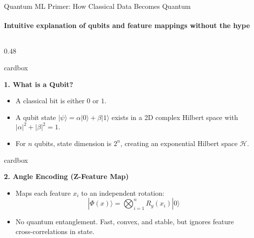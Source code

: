 \documentclass[aspectratio=169, 10pt]{beamer}
\newcommand{\cardbox}[3]{%
  \begin{beamercolorbox}[wd=\linewidth,rounded=true,sep=2.5pt]{cardbox}%
    {\bfseries\scriptsize\color{#1}#2\par}\vspace*{1pt}%
    {\footnotesize #3}%
  \end{beamercolorbox}%
}
\begin{document}
\begin{frame}{Quantum ML Primer: How Classical Data Becomes Quantum}
  \framesubtitle{Intuitive explanation of qubits and feature mappings without the hype}

  \begin{columns}[T]
    \begin{column}{0.48\textwidth}
      \cardbox{DeepPurple}{1. What is a Qubit?}{
        \begin{itemize}\setlength\itemsep{1pt}\scriptsize
          \item A classical bit is either $0$ or $1$.
          \item A qubit state $|\psi\rangle = \alpha|0\rangle + \beta|1\rangle$ exists in a 2D complex Hilbert space with $|\alpha|^2 + |\beta|^2 = 1$.
          \item For $n$ qubits, state dimension is $2^n$, creating an exponential Hilbert space $\mathcal{H}$.
        \end{itemize}
      }
      \vspace*{3pt}
      \cardbox{MedPurple}{2. Angle Encoding (Z-Feature Map)}{
        \begin{itemize}\setlength\itemsep{1pt}\scriptsize
          \item Maps each feature $x_i$ to an independent rotation:
          \[
            |\Phi(x)\rangle = \bigotimes_{i=1}^n R_y(x_i)|0\rangle
          \]
          \item No quantum entanglement. Fast, convex, and stable, but ignores feature cross-correlations in state.
        \end{itemize}
      }
    \end{column}


\end{columns}
\end{frame}
\end{document}
